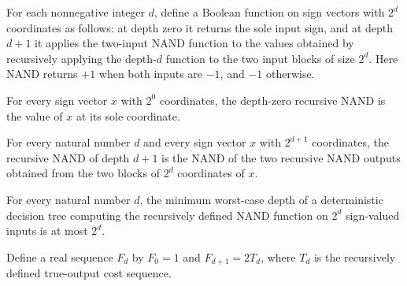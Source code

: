 \begin{definition}
\label{FABL.recursiveNAND}
\leanok
{}
For each nonnegative integer $d$, define a Boolean function on sign vectors with $2^d$
coordinates as follows: at depth zero it returns the sole input sign, and at depth $d+1$
it applies the two-input NAND function to the values obtained by recursively applying
the depth-$d$ function to the two input blocks of size $2^d$. Here NAND returns $+1$
when both inputs are $-1$, and $-1$ otherwise.
\end{definition}

\begin{theorem}
\label{FABL.recursiveNAND_zero}
\leanok
{}
For every sign vector $x$ with $2^0$ coordinates, the depth-zero recursive NAND is the
value of $x$ at its sole coordinate.
\end{theorem}

\begin{theorem}
\label{FABL.recursiveNAND_succ}
\leanok
{}
For every natural number $d$ and every sign vector $x$ with $2^{d+1}$ coordinates, the
recursive NAND of depth $d+1$ is the NAND of the two recursive NAND outputs obtained
from the two blocks of $2^d$ coordinates of $x$.
\end{theorem}

\begin{theorem}
\label{FABL.deterministicDepth_recursiveNAND_le}
\leanok
{}
For every natural number $d$, the minimum worst-case depth of a deterministic decision
tree computing the recursively defined NAND function on $2^d$ sign-valued inputs is at
most $2^d$.
\end{theorem}

\begin{definition}
\label{FABL.recursiveNandFalseCost}
\leanok
Define a real sequence $F_d$ by $F_0=1$ and $F_{d+1}=2T_d$, where $T_d$ is the
recursively defined true-output cost sequence.
\end{definition}

